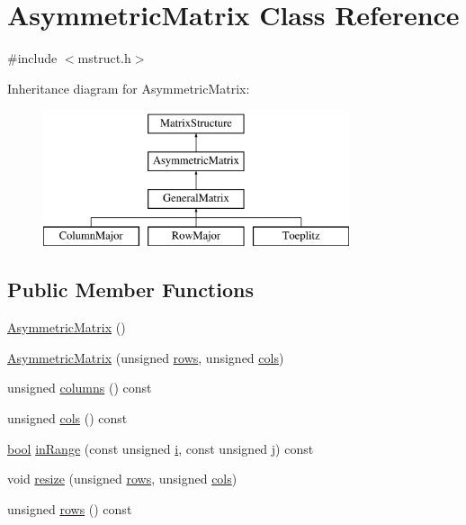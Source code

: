 \hypertarget{classAsymmetricMatrix}{}\section{Asymmetric\+Matrix Class Reference}
\label{classAsymmetricMatrix}


{\ttfamily \#include $<$mstruct.\+h$>$}

Inheritance diagram for Asymmetric\+Matrix\+:\begin{figure}[H]
\begin{center}
\leavevmode
\includegraphics[height=4.000000cm]{classAsymmetricMatrix}
\end{center}
\end{figure}
\subsection*{Public Member Functions}
\begin{DoxyCompactItemize}
\item 
\hyperlink{classAsymmetricMatrix_ad9b329cf540fe9b92931a4df12097169}{Asymmetric\+Matrix} ()
\item 
\hyperlink{classAsymmetricMatrix_abac34ac1f4ae84f4823719e096676e2e}{Asymmetric\+Matrix} (unsigned \hyperlink{classAsymmetricMatrix_adf8ff298b6b24882a147fdcedebe1bbd}{rows}, unsigned \hyperlink{classAsymmetricMatrix_a5ef0ec381e4d33a1f19be7c3e26410d4}{cols})
\item 
unsigned \hyperlink{classAsymmetricMatrix_a9029ba3ac3d153656937b5028eb20b4f}{columns} () const 
\item 
unsigned \hyperlink{classAsymmetricMatrix_a5ef0ec381e4d33a1f19be7c3e26410d4}{cols} () const 
\item 
\hyperlink{compiler_8h_abb452686968e48b67397da5f97445f5b}{bool} \hyperlink{classAsymmetricMatrix_a2454085bcbf885b2f8cd94a9ed70de65}{in\+Range} (const unsigned \hyperlink{indexexpr_8h_aabd77643995707c185e95c8cb2782c81}{i}, const unsigned \hyperlink{indexexpr_8h_aa1f3325d66516548e69238097857fa98}{j}) const 
\item 
void \hyperlink{classAsymmetricMatrix_a586bdfd0f1cc7bb0163a562e8f1b6980}{resize} (unsigned \hyperlink{classAsymmetricMatrix_adf8ff298b6b24882a147fdcedebe1bbd}{rows}, unsigned \hyperlink{classAsymmetricMatrix_a5ef0ec381e4d33a1f19be7c3e26410d4}{cols})
\item 
unsigned \hyperlink{classAsymmetricMatrix_adf8ff298b6b24882a147fdcedebe1bbd}{rows} () const 
\end{DoxyCompactItemize}
